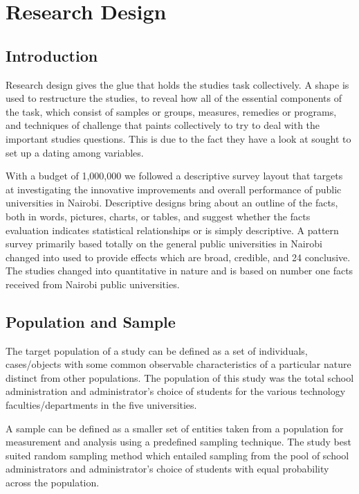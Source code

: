 \chapter{\huge{\textbf{Research Design}}}

\section{\textbf{Introduction}}
Research design gives the glue that holds the studies task collectively. A shape is used to restructure the studies, to reveal how all of the essential components of the task, which consist of samples or groups, measures, remedies or programs, and techniques of challenge that paints collectively to try to deal with the important studies questions. This is due to the fact they have a look at sought to set up a dating among variables.

With a budget of 1,000,000 we followed a descriptive survey layout that targets at investigating the innovative improvements and overall performance of public universities in Nairobi. Descriptive designs bring about an outline of the facts, both in words, pictures, charts, or tables, and suggest whether the facts evaluation indicates statistical relationships or is simply descriptive. A pattern survey primarily based totally on the general public universities in Nairobi changed into used to provide effects which are broad, credible, and 24 conclusive. The studies changed into quantitative in nature and is based on number one facts received from Nairobi public universities.

\section{\textbf{Population and Sample}}
The target population of a study can be defined as a set of individuals, cases/objects with some common observable characteristics of a particular nature distinct from other populations. The population of this study was the total school administration and administrator's choice of students for the various technology faculties/departments in the five universities.

A sample can be defined as a smaller set of entities taken from a population for measurement and analysis using a predefined sampling technique. The study best suited random sampling method which entailed sampling from the pool of school administrators and administrator's choice of students with equal probability across the population. 

